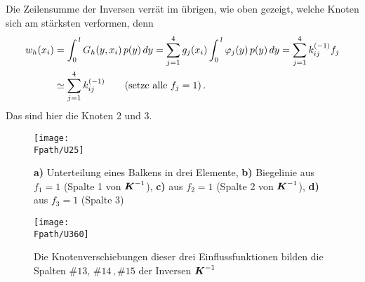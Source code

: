 Die Zeilensumme der Inversen verr\"{a}t im \"{u}brigen, wie oben gezeigt, welche Knoten sich am st\"{a}rksten verformen, denn
\begin{align}
w_h(x_i) &= \int_0^{\,l} G_h(y,x_i)\,p(y)\,dy = \sum_{j = 1}^4 g_j(x_i) \int_0^{\,l} \varphi_j(y)\,p(y)\,dy = \sum_{j = 1}^4 k_{ij}^{(-1)} f_j\nonumber \\
&\simeq  \sum_{j = 1}^4 k_{ij}^{(-1)} \qquad (\text{setze alle $f_j = 1$)}\,.
\end{align}
Das sind hier die Knoten 2 und 3.
\begin{figure}
\centering
{\texttt{[image: \\Fpath/U25]}}
  \caption{\textbf{ a)} Unterteilung eines Balkens in drei Elemente,
  \textbf{ b)} Biegelinie aus $f_1 = 1$ (Spalte 1 von $\mbox{\boldmath $K$}^{-1}$),  \textbf{ c)} aus $f_2 = 1$ (Spalte 2 von $\mbox{\boldmath $K$}^{-1}$),   \textbf{ d)} aus $f_3 = 1$ (Spalte 3)}
  \label{U25}
\end{figure}
\begin{figure}
\centering
{\texttt{[image: \\Fpath/U360]}}
  \caption{Die Knotenverschiebungen dieser drei Einflussfunktionen bilden die Spalten $\#13, \,\#14\,, \#15$ der Inversen $\mbox{\boldmath $K$}^{-1}$}
  \label{UE360}
\end{figure}

